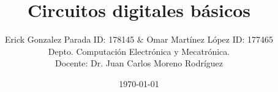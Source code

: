 \documentclass{article}
\begin{document}

\renewcommand{\footrulewidth}{1pt}
\renewcommand{\tablename}{Tabla}
\renewcommand{\figurename}{Figura}


\title{Circuitos digitales básicos}
\author{\small{Erick Gonzalez Parada ID: 178145 $\&$ Omar Martínez López ID: 177465}\\ 
\small{ Depto. Computación Electrónica y Mecatrónica.} \\
\small {Docente: Dr. Juan Carlos Moreno Rodríguez}}

\date{\small{\today}}

\maketitle

\end{document}
